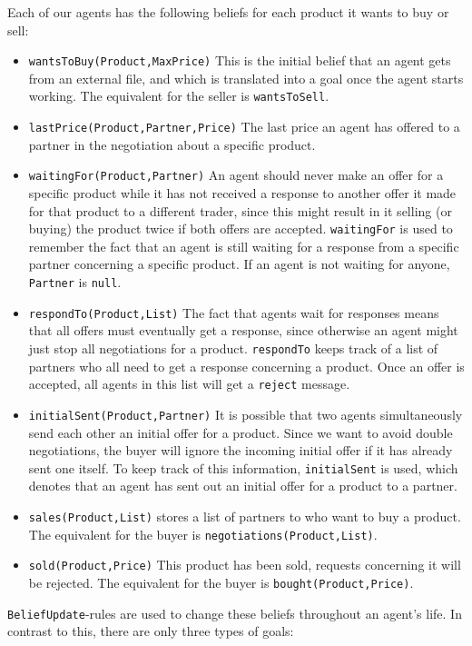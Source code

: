 \documentclass[a4paper,11pt]{article}
\begin{document}
Each of our agents has the following beliefs for each product it wants to buy or sell:
\begin{itemize}
  \item \texttt{wantsToBuy(Product,MaxPrice)} This is the initial belief that an agent gets from an external file, and which is translated into a goal once the agent starts working. The equivalent for the seller is \texttt{wantsToSell}.
  \item \texttt{lastPrice(Product,Partner,Price)} The last price an agent has offered to a partner in the negotiation about a specific product.
  \item \texttt{waitingFor(Product,Partner)} An agent should never make an offer for a specific product while it has not received a response to another offer it made for that product to a different trader, since this might result in it selling (or buying) the product twice if both offers are accepted. \texttt{waitingFor} is used to remember the fact that an agent is still waiting for a response from a specific partner concerning a specific product. If an agent is not waiting for anyone, \texttt{Partner} is \texttt{null}.
 \item \texttt{respondTo(Product,List)} The fact that agents wait for responses means that all offers must eventually get a response, since otherwise an agent might just stop all negotiations for a product. \texttt{respondTo} keeps track of a list of partners who all need to get a response concerning a product. Once an offer is accepted, all agents in this list will get a \texttt{reject} message.
\item \texttt{initialSent(Product,Partner)} It is possible that two agents simultaneously send each other an initial offer for a product. Since we want to avoid double negotiations, the buyer will ignore the incoming initial offer if it has already sent one itself. To keep track of this information, \texttt{initialSent} is used, which denotes that an agent has sent out an initial offer for a product to a partner.
\item \texttt{sales(Product,List)} stores a list of partners to who want to buy a product. The equivalent for the buyer is \texttt{negotiations(Product,List)}.
\item \texttt{sold(Product,Price)} This product has been sold, requests concerning it will be
rejected. The equivalent for the buyer is \texttt{bought(Product,Price)}.
\end{itemize}

\noindent \texttt{BeliefUpdate}-rules are used to change these beliefs throughout an agent's life. In contrast to this, there are only three types of goals:
\end{document}
